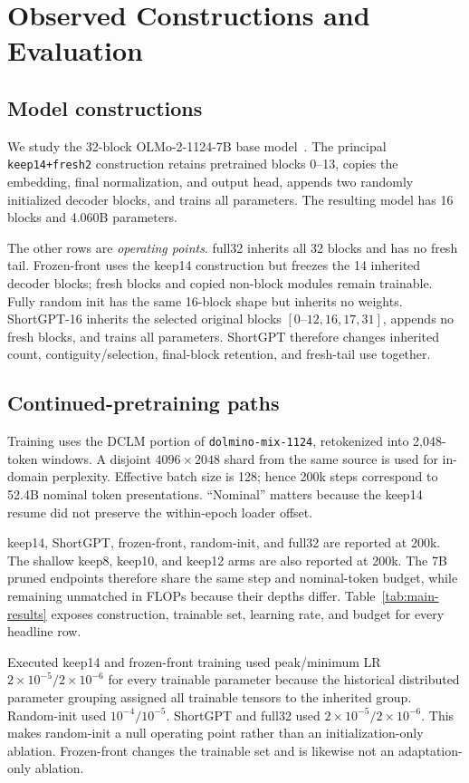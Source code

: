 \section{Observed Constructions and Evaluation}
\label{sec:method}

\subsection{Model constructions}
We study the 32-block OLMo-2-1124-7B base model~\citep{olmo2}. The principal
\texttt{keep14+fresh2} construction retains pretrained blocks 0--13, copies the
embedding, final normalization, and output head, appends two randomly
initialized decoder blocks, and trains all parameters. The resulting model has
16 blocks and 4.060B parameters.

The other rows are \emph{operating points}. full32 inherits all 32 blocks and
has no fresh tail. Frozen-front uses the keep14 construction but freezes the 14
inherited decoder blocks; fresh blocks and copied non-block modules remain
trainable. Fully random init has the same 16-block shape but inherits no
weights. ShortGPT-16 inherits the selected original blocks
$[0\text{--}12,16,17,31]$, appends no fresh blocks, and trains all parameters.
ShortGPT therefore changes inherited count, contiguity/selection, final-block
retention, and fresh-tail use together.

\subsection{Continued-pretraining paths}
Training uses the DCLM portion of \texttt{dolmino-mix-1124}, retokenized into
2,048-token windows. A disjoint $4096\times2048$ shard from the same source is
used for in-domain perplexity. Effective batch size is 128; hence 200k steps
correspond to 52.4B nominal token presentations. ``Nominal''
matters because the keep14 resume did not preserve the within-epoch loader
offset.

keep14, ShortGPT, frozen-front, random-init, and full32 are reported at 200k.
The shallow keep8, keep10, and keep12 arms
are also reported at 200k. The 7B pruned endpoints therefore share the same step
and nominal-token budget, while remaining unmatched in FLOPs because their
depths differ. Table~\ref{tab:main-results} exposes construction, trainable set,
learning rate, and budget for every headline row.

Executed keep14 and frozen-front training used peak/minimum LR
$2\times10^{-5}/2\times10^{-6}$ for every trainable parameter because the
historical distributed parameter grouping assigned all trainable tensors to
the inherited group. Random-init used $10^{-4}/10^{-5}$. ShortGPT and full32
used $2\times10^{-5}/2\times10^{-6}$. This makes random-init a null operating
point rather than an initialization-only ablation. Frozen-front changes the
trainable set and is likewise not an adaptation-only ablation.

